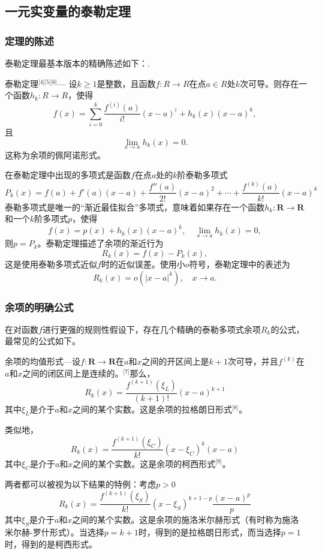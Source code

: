 \subsection{一元实变量的泰勒定理} 
\subsubsection{定理的陈述}  
泰勒定理最基本版本的精确陈述如下：.

泰勒定理\(^\text{[4][5][6]}\)— 设\( k \geq 1 \)是整数，且函数\( f : R\to R\)在点\(a \in R\)处\( k \)次可导。则存在一个函数\( h_k : R\to R\)，使得
\[
f(x) = \sum_{i=0}^{k} \frac{f^{(i)}(a)}{i!} (x - a)^i + h_k(x)(x - a)^k,~
\]
且
\[
\lim_{x \to a} h_k(x) = 0.~
\]
这称为余项的佩阿诺形式。

在泰勒定理中出现的多项式是函数\( f \)在点\( a \)处的\( k \)阶泰勒多项式
\[
P_k(x) = f(a) + f'(a)(x - a) + \frac{f''(a)}{2!}(x - a)^2 + \cdots + \frac{f^{(k)}(a)}{k!}(x - a)^k~
\]
泰勒多项式是唯一的“渐近最佳拟合”多项式，意味着如果存在一个函数\( h_k : \mathbf{R} \to \mathbf{R}\) 和一个\( k \)阶多项式\( p \)，使得
\[
f(x) = p(x) + h_k(x)(x - a)^k, \quad \lim_{x \to a} h_k(x) = 0,~
\]
则\( p = P_k \)。泰勒定理描述了余项的渐近行为
\[
R_k(x) = f(x) - P_k(x),~
\]
这是使用泰勒多项式近似\( f \)时的近似误差。使用小\( o \)符号，泰勒定理中的表述为
\[
R_k(x) = o(|x - a|^k), \quad x \to a.~
\]
\subsubsection{余项的明确公式}  
在对函数\( f \)进行更强的规则性假设下，存在几个精确的泰勒多项式余项\( R_k \)的公式，最常见的公式如下。

余项的均值形式—设\( f :\mathbf{R} \to \mathbf{R} \)在\( a \)和\( x \)之间的开区间上是\( k + 1 \)次可导，并且\( f^{(k)} \)在\( a \)和\( x \)之间的闭区间上是连续的。\(^\text{[7]}\)那么，
\[
R_k(x) = \frac{f^{(k+1)}(\xi_L)}{(k+1)!}(x - a)^{k+1}~
\]
其中\( \xi_L \)是介于\( a \)和\( x \)之间的某个实数。这是余项的拉格朗日形式\(^\text{[8]}\)。

类似地，
\[
R_k(x) = \frac{f^{(k+1)}(\xi_C)}{k!}(x - \xi_C)^k(x - a)~
\]
其中\( \xi_C \)是介于\( a \)和\( x \)之间的某个实数。这是余项的柯西形式\(^\text{[9]}\)。

两者都可以被视为以下结果的特例：考虑\( p > 0 \)
\[
R_k(x) = \frac{f^{(k+1)}(\xi_S)}{k!}(x - \xi_S)^{k+1-p} \frac{(x - a)^p}{p}~
\]
其中\( \xi_S \)是介于\( a \)和\( x \)之间的某个实数。这是余项的施洛米尔赫形式（有时称为施洛米尔赫-罗什形式）。当选择\( p = k + 1 \)时，得到的是拉格朗日形式，而当选择\( p = 1 \)时，得到的是柯西形式。

